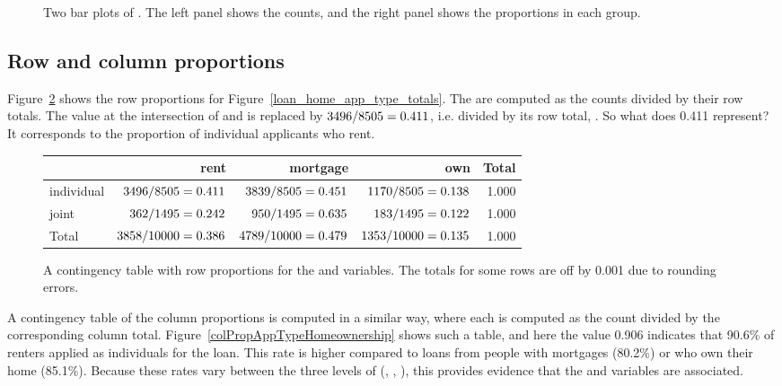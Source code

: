 \begin{figure}[bht]
  \centering
  \caption{Two bar plots of .
      The left panel shows the counts, and the right panel
      shows the proportions in each group.}
  \label{loan_homeownership_bar_plot}
\end{figure}


\subsection{Row and column proportions}

Figure~\ref{rowPropAppTypeHomeownership}
shows the row proportions for
Figure~\ref{loan_home_app_type_totals}.
The 
are computed as the counts divided by their row totals.
The value \loanapphomeAA{} at the intersection of
 and  is replaced by
$3496{}/8505{} = 0.411$,
i.e. \loanapphomeAA{} divided by its row total,
\loanapphomeAD{}.
So what does 0.411 represent?
It corresponds to the proportion of individual
applicants who rent.

\begin{figure}
\centering
\begin{tabular}{l rrr r}
  \hline
  & rent & mortgage & own & Total \\
  \hline
  individual & 
      $3496{}/8505{} = 0.411$ &
      $3839{}/8505{} = 0.451$ &
      $1170{}/8505{} = 0.138$ &
      1.000 \\
  joint &
      $362{}/1495{} = 0.242$ &
      $950{}/1495{} = 0.635$ &
      $183{}/1495{} = 0.122$ &
      1.000 \\
  \hline
  Total &
      $3858{}/10000{} = 0.386$ &
      $4789{}/10000{} = 0.479$ &
      $1353{}/10000{} = 0.135$ &
      1.000 \\
  \hline
\end{tabular}
\caption{A contingency table with row proportions
    for the  and
     variables.
    The totals for some rows are off by 0.001
    due to rounding errors.}
\label{rowPropAppTypeHomeownership}
\end{figure}

A contingency table of the column proportions is computed in a similar way, where each  is computed as the count divided by the corresponding column total. Figure~\ref{colPropAppTypeHomeownership} shows such a table, and here the value 0.906 indicates that 90.6\% of renters applied as individuals for the loan. This rate is higher compared to loans from people with mortgages (80.2\%) or who own their home (85.1\%). Because these rates vary between the three levels of  (, , ), this provides evidence that the  and  variables are associated.

